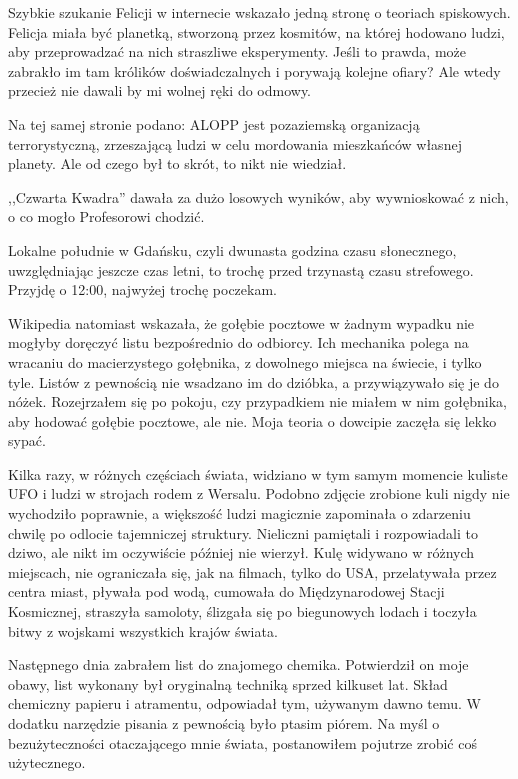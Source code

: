 Szybkie szukanie Felicji w internecie wskazało jedną stronę o teoriach spiskowych.
Felicja miała być planetką, stworzoną przez kosmitów, na której hodowano ludzi, aby przeprowadzać na nich straszliwe eksperymenty.
Jeśli to prawda, może zabrakło im tam królików doświadczalnych i porywają kolejne ofiary?
Ale wtedy przecież nie dawali by mi wolnej ręki do odmowy.

Na tej samej stronie podano: ALOPP jest pozaziemską organizacją terrorystyczną, zrzeszającą ludzi w celu mordowania mieszkańców własnej planety.
Ale od czego był to skrót, to nikt nie wiedział.

,,Czwarta Kwadra'' dawała za dużo losowych wyników, aby wywnioskować z nich, o co mogło Profesorowi chodzić.

Lokalne południe w Gdańsku, czyli dwunasta godzina czasu słonecznego, uwzględniając jeszcze czas letni, to trochę przed trzynastą czasu strefowego.
Przyjdę o 12:00, najwyżej trochę poczekam.

Wikipedia natomiast wskazała, że gołębie pocztowe w żadnym wypadku nie mogłyby doręczyć listu bezpośrednio do odbiorcy.
Ich mechanika polega na wracaniu do macierzystego gołębnika, z dowolnego miejsca na świecie, i tylko tyle.
Listów z pewnością nie wsadzano im do dzióbka, a przywiązywało się je do nóżek.
Rozejrzałem się po pokoju, czy przypadkiem nie miałem w nim gołębnika, aby hodować gołębie pocztowe, ale nie.
Moja teoria o dowcipie zaczęła się lekko sypać.

Kilka razy, w różnych częściach świata, widziano w tym samym momencie kuliste UFO i ludzi w strojach rodem z Wersalu.
Podobno zdjęcie zrobione kuli nigdy nie wychodziło poprawnie, a większość ludzi magicznie zapominała o zdarzeniu chwilę po odlocie tajemniczej struktury.
Nieliczni pamiętali i rozpowiadali to dziwo, ale nikt im oczywiście później nie wierzył.
Kulę widywano w różnych miejscach, nie ograniczała się, jak na filmach, tylko do USA, przelatywała przez centra miast, pływała pod wodą, cumowała do Międzynarodowej Stacji Kosmicznej, straszyła samoloty, ślizgała się po biegunowych lodach i toczyła bitwy z wojskami wszystkich krajów świata.

Następnego dnia zabrałem list do znajomego chemika.
Potwierdził on moje obawy, list wykonany był oryginalną techniką sprzed kilkuset lat.
Skład chemiczny papieru i atramentu, odpowiadał tym, używanym dawno temu.
W dodatku narzędzie pisania z pewnością było ptasim piórem.
Na myśl o bezużyteczności otaczającego mnie świata, postanowiłem pojutrze zrobić coś użytecznego.

